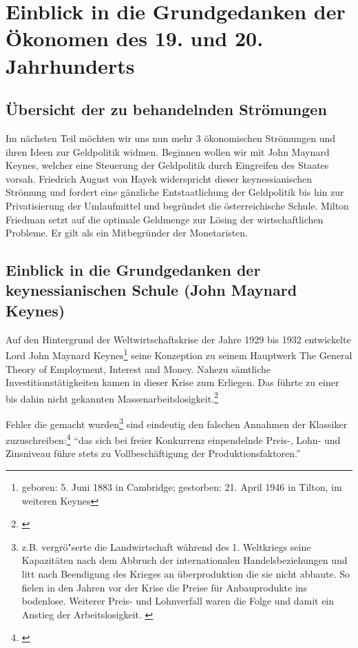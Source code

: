 \documentclass[
        onecolumn,
        a4paper,
        abstracton,
        parskip=half
        ,final
        ]{scrartcl}
\begin{document}
\clearpage





\section{Einblick in die Grundgedanken der {\"O}konomen des 19. und 20. Jahrhunderts}
  \label{sec3:stroemungen}
\subsection{{\"U}bersicht der zu behandelnden Str{\"o}mungen} %

Im n{\"a}chsten Teil m{\"o}chten wir uns nun mehr 3 {\"o}konomischen Str{\"o}mungen und ihren Ideen zur Geldpolitik widmen. Beginnen wollen wir mit John Maynard Keynes, welcher eine Steuerung der Geldpolitik durch Eingreifen des Staates vorsah. Friedrich August von Hayek widerspricht dieser keynessianischen Str{\"o}mung und fordert eine g{\"a}nzliche Entstaatlichung der Geldpolitik bis hin zur Privatisierung der Umlaufmittel und begr{\"u}ndet die {\"o}sterreichische Schule. Milton Friedman setzt auf die optimale Geldmenge zur L{\"o}sing der wirtschaftlichen Probleme. Er gilt als ein Mitbegr{\"u}nder der Monetaristen.


\subsection{Einblick in die Grundgedanken der keynessianischen Schule (John Maynard Keynes)} %

Auf den Hintergrund der Weltwirtschaftskrise der Jahre 1929 bis 1932 entwickelte Lord John Maynard Keynes\footnote[14]{geboren: 5. Juni 1883 in Cambridge; gestorben: 21. April 1946 in Tilton, im weiteren Keynes} seine Konzeption zu seinem Hauptwerk \frqq The General Theory of Employment, Interest and Money\flqq. Nahezu s{\"a}mtliche Investitionst{\"a}tigkeiten kamen in dieser Krise zum Erliegen. Das f{\"u}hrte zu einer bis dahin nicht gekannten Massenarbeitslosigkeit.\footnote[601]{\citep*[S.203]{peters2000}}

Fehler die gemacht wurden\footnote[602]{z.B. vergr{\"o}{"s}erte die Landwirtschaft w{\"a}hrend des 1. Weltkriegs seine Kapazit{\"a}ten nach dem Abbruch der internationalen Handelsbeziehungen und litt nach Beendigung des Krieges an {\"u}berproduktion die sie nicht abbaute. So fielen in den Jahren vor der Krise die Preise f{\"u}r Anbauprodukte ins bodenlose. Weiterer Preis- und Lohnverfall waren die Folge und damit ein Anstieg der Arbeitslosigkeit. \citep*[vgl.][S.14ff]{bombach1981theorie}} sind eindeutig den falschen Annahmen der Klassiker zuzuschreiben:\footnote[603]{\citep*[S.36]{Keynes2011}} "`das sich bei freier Konkurrenz einpendelnde Preis-, Lohn- und Zinsniveau f{\"u}hre stets zu Vollbesch{\"a}ftigung der Produktionsfaktoren."'
\end{document}
